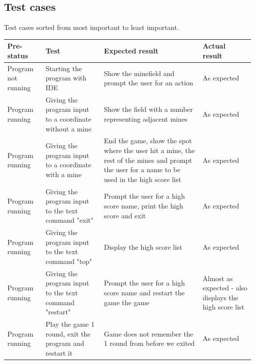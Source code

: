 \documentclass[UKenglish]{article}  %
\begin{document}
\subsection{Test cases}
Test cases sorted from most important to least important.

\begin{table}[H]
    \centering
    \begin{tabular}{| m{1.5in} |  m{1.5in}  | m{1.5in} | m{0.75in} |}
        \hline

        \textbf{Pre-status} & \textbf{Test} & 
        \textbf{Expected result} & \textbf{Actual result} \\ \hline

        Program not running & Starting the program with IDE & Show the minefield
        and prompt the user for an action  & As expected \\ \hline

        Program running & Giving the program input to a coordinate without a
        mine & Show the field with a number representing adjacent mines & As
        expected \\ \hline

        Program running & Giving the program input to a coordinate with a mine &
        End the game, show the spot where the user hit a mine, the rest of the
        mines and prompt the user for a name to be used in the high score list &
        As expected \\ \hline

        Program running & Giving the program input to the text command "exit" &
        Prompt the user for a high score name, print the high score and exit &
        As expected \\ \hline

        Program running & Giving the program input to the text command "top" &
        Display the high score list & As expected \\ \hline

        Program running & Giving the program input to the text command "restart"
        & Prompt the user for a high score name and restart the game the game &
        Almost as expected - also displays the high score list \\ \hline

        Program running & Play the game 1 round, exit the program and restart
        it & Game does not remember the 1 round from before we exited & As
        expected \\ \hline


\end{tabular}
\end{table}
\end{document}
